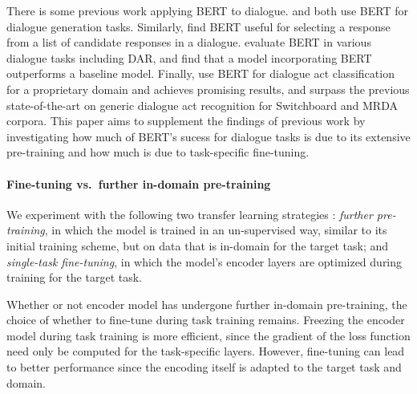 \documentclass[11pt,a4paper]{article}
\begin{document}
There is some previous work applying BERT to dialogue.
\citet{baoPLATOPretrainedDialogue2019} and \citet{chenSemanticallyConditionedDialog2019a} both use BERT for dialogue generation tasks.
Similarly, \citet{vigComparisonTransferLearningApproaches2019} find BERT useful for selecting a response from a list of candidate responses in a dialogue.
\citet{mehriPretrainingMethodsDialog2019} evaluate BERT in various dialogue tasks including DAR, and find that a model incorporating BERT outperforms a baseline model.
Finally, \citet{chakravarty2019dialog} use BERT for dialogue act classification for a proprietary domain and achieves promising results, and \citet{ribeiro2019deep} surpass the previous state-of-the-art on generic dialogue act recognition for Switchboard and MRDA corpora. 
This paper aims to supplement the findings of previous work by investigating how much of 
BERT's sucess for dialogue tasks is due to its extensive pre-training and how much is due to 
task-specific fine-tuning.




\paragraph{Fine-tuning vs.~further in-domain pre-training}
We experiment with the following two transfer learning strategies \citep{sunHowFineTuneBERT2019}:
\emph{further pre-training}, in which the model is trained in an un-supervised way, similar to its initial training scheme, but on data that is in-domain for the target task; and
\emph{single-task fine-tuning}, in which the model's encoder layers are optimized during training for the target task.

Whether or not encoder model has undergone further in-domain pre-training, 
the choice of whether to fine-tune during task training remains.
Freezing the encoder model during task training is more efficient, 
since the gradient of the loss function need only be computed for the task-specific layers.
However, fine-tuning can lead to better performance since the encoding itself is adapted to the target task and domain.
\end{document}
